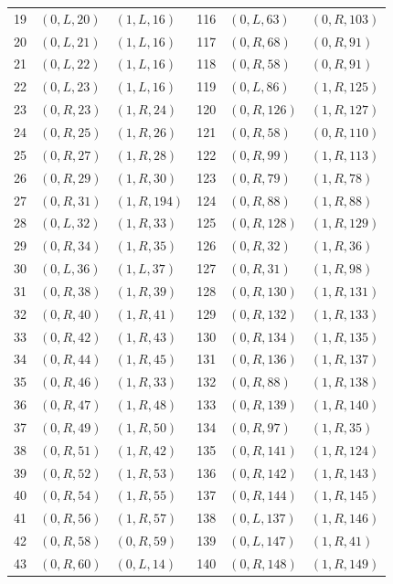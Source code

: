 \begin{longtable}{r@{\quad}ll@{\qquad}r@{\quad}ll}
19 & $(0,L,20)$ & $(1,L,16)$ & 116 & $(0,L,63)$ & $(0,R,103)$\\
20 & $(0,L,21)$ & $(1,L,16)$ & 117 & $(0,R,68)$ & $(0,R,91)$\\
21 & $(0,L,22)$ & $(1,L,16)$ & 118 & $(0,R,58)$ & $(0,R,91)$\\
22 & $(0,L,23)$ & $(1,L,16)$ & 119 & $(0,L,86)$ & $(1,R,125)$\\
23 & $(0,R,23)$ & $(1,R,24)$ & 120 & $(0,R,126)$ & $(1,R,127)$\\
24 & $(0,R,25)$ & $(1,R,26)$ & 121 & $(0,R,58)$ & $(0,R,110)$\\
25 & $(0,R,27)$ & $(1,R,28)$ & 122 & $(0,R,99)$ & $(1,R,113)$\\
26 & $(0,R,29)$ & $(1,R,30)$ & 123 & $(0,R,79)$ & $(1,R,78)$\\
27 & $(0,R,31)$ & $(1,R,194)$ & 124 & $(0,R,88)$ & $(1,R,88)$\\
28 & $(0,L,32)$ & $(1,R,33)$ & 125 & $(0,R,128)$ & $(1,R,129)$\\
29 & $(0,R,34)$ & $(1,R,35)$ & 126 & $(0,R,32)$ & $(1,R,36)$\\
30 & $(0,L,36)$ & $(1,L,37)$ & 127 & $(0,R,31)$ & $(1,R,98)$\\
31 & $(0,R,38)$ & $(1,R,39)$ & 128 & $(0,R,130)$ & $(1,R,131)$\\
32 & $(0,R,40)$ & $(1,R,41)$ & 129 & $(0,R,132)$ & $(1,R,133)$\\
33 & $(0,R,42)$ & $(1,R,43)$ & 130 & $(0,R,134)$ & $(1,R,135)$\\
34 & $(0,R,44)$ & $(1,R,45)$ & 131 & $(0,R,136)$ & $(1,R,137)$\\
35 & $(0,R,46)$ & $(1,R,33)$ & 132 & $(0,R,88)$ & $(1,R,138)$\\
36 & $(0,R,47)$ & $(1,R,48)$ & 133 & $(0,R,139)$ & $(1,R,140)$\\
37 & $(0,R,49)$ & $(1,R,50)$ & 134 & $(0,R,97)$ & $(1,R,35)$\\
38 & $(0,R,51)$ & $(1,R,42)$ & 135 & $(0,R,141)$ & $(1,R,124)$\\
39 & $(0,R,52)$ & $(1,R,53)$ & 136 & $(0,R,142)$ & $(1,R,143)$\\
40 & $(0,R,54)$ & $(1,R,55)$ & 137 & $(0,R,144)$ & $(1,R,145)$\\
41 & $(0,R,56)$ & $(1,R,57)$ & 138 & $(0,L,137)$ & $(1,R,146)$\\
42 & $(0,R,58)$ & $(0,R,59)$ & 139 & $(0,L,147)$ & $(1,R,41)$\\
43 & $(0,R,60)$ & $(0,L,14)$ & 140 & $(0,R,148)$ & $(1,R,149)$\\

\end{longtable}
